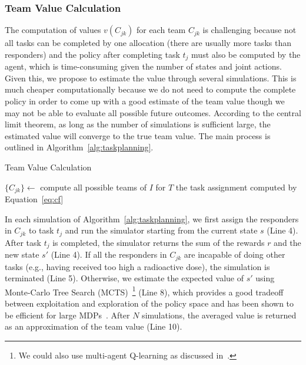 \subsubsection{Team Value Calculation}
\noindent The computation of values  $v(C_{jk})$ for each team
$C_{jk}$ is challenging because not all tasks can be completed by
one allocation (there are usually more tasks than responders) and
the policy after completing task $t_j$ must also be computed by the
agent, which is time-consuming given the number of states and joint
actions. Given this, we propose to estimate the value through
several simulations. This is much cheaper computationally because
we do not need to compute the complete policy in order to come up
with a good estimate of the team value though we may not be able to
evaluate all possible future outcomes. According to the central
limit theorem, as long as the number of simulations is sufficient
large, the estimated value will converge to the true team value.
The main process is outlined in Algorithm~\ref{alg:taskplanning}.
\begin{algorithm}[htbp]\small
  \caption{Team Value Calculation}
  \label{alg:taskplanning}
  \Indm
  \Indp\BlankLine
  $\{ C_{jk} \} \gets$ compute all possible teams of $I$ for
  $T$ \;
  \Return the task assignment computed by Equation~\ref{eq:cf}
\end{algorithm}

In each simulation of Algorithm~\ref{alg:taskplanning}, we first
assign the responders in $C_{jk}$ to task $t_j$ and run the
simulator starting from the current state $s$ (Line 4). After task
$t_j$ is completed, the simulator returns the sum of the rewards
$r$ and the new state $s'$ (Line 4). If all the responders in
$C_{jk}$ are incapable of doing other tasks (e.g., having received
too high a radioactive dose), the simulation is terminated (Line
5). Otherwise, we estimate the expected value of $s'$ using
Monte-Carlo Tree Search (MCTS)~\footnote{We could also use
multi-agent Q-learning as discussed in~\cite{proper2009solving}.}
(Line 8), which provides a good tradeoff between exploitation and
exploration of the policy space and has been shown to be efficient
for large MDPs~\cite{kocsis2006bandit}. After $N$ simulations, the
averaged value is returned as an approximation of the team value
(Line 10).


